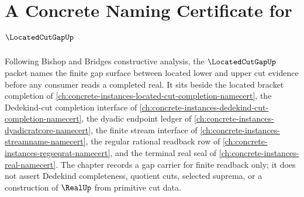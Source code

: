 \chapter{A Concrete Naming Certificate for $\LocatedCutGapUp$}
\label{ch:concrete-instances-located-cut-gap-namecert}

Following Bishop and Bridges constructive analysis, the $\LocatedCutGapUp$ packet names the finite gap surface between located lower and upper cut evidence before any consumer reads a completed real. It sits beside the located bracket completion of \autoref{ch:concrete-instances-located-cut-completion-namecert}, the Dedekind-cut completion interface of \autoref{ch:concrete-instances-dedekind-cut-completion-namecert}, the dyadic endpoint ledger of \autoref{ch:concrete-instances-dyadicratcore-namecert}, the finite stream interface of \autoref{ch:concrete-instances-streamname-namecert}, the regular rational readback row of \autoref{ch:concrete-instances-regseqrat-namecert}, and the terminal real seal of \autoref{ch:concrete-instances-real-namecert}. The chapter records a gap carrier for finite readback only; it does not assert Dedekind completeness, quotient cuts, selected suprema, or a construction of $\RealUp$ from primitive cut data.


